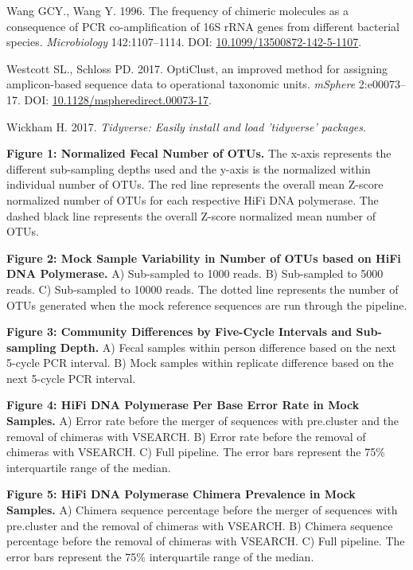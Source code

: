 \documentclass[12pt,]{article}
\begin{document}
\hypertarget{ref-Wang1996}{}
Wang GCY., Wang Y. 1996. The frequency of chimeric molecules as a
consequence of PCR co-amplification of 16S rRNA genes from different
bacterial species. \emph{Microbiology} 142:1107--1114. DOI:
\href{https://doi.org/10.1099/13500872-142-5-1107}{10.1099/13500872-142-5-1107}.

\hypertarget{ref-opticlust_Westcott_2017}{}
Westcott SL., Schloss PD. 2017. OptiClust, an improved method for
assigning amplicon-based sequence data to operational taxonomic units.
\emph{mSphere} 2:e00073--17. DOI:
\href{https://doi.org/10.1128/mspheredirect.00073-17}{10.1128/mspheredirect.00073-17}.

\hypertarget{ref-tidyverse_2017}{}
Wickham H. 2017. \emph{Tidyverse: Easily install and load 'tidyverse'
packages}.

\newpage

\textbf{Figure 1: Normalized Fecal Number of OTUs.} The x-axis
represents the different sub-sampling depths used and the y-axis is the
normalized within individual number of OTUs. The red line represents the
overall mean Z-score normalized number of OTUs for each respective HiFi
DNA polymerase. The dashed black line represents the overall Z-score
normalized mean number of OTUs.

\textbf{Figure 2: Mock Sample Variability in Number of OTUs based on
HiFi DNA Polymerase.} A) Sub-sampled to 1000 reads. B) Sub-sampled to
5000 reads. C) Sub-sampled to 10000 reads. The dotted line represents
the number of OTUs generated when the mock reference sequences are run
through the pipeline.

\textbf{Figure 3: Community Differences by Five-Cycle Intervals and
Sub-sampling Depth.} A) Fecal samples within person difference based on
the next 5-cycle PCR interval. B) Mock samples within replicate
difference based on the next 5-cycle PCR interval.

\textbf{Figure 4: HiFi DNA Polymerase Per Base Error Rate in Mock
Samples.} A) Error rate before the merger of sequences with pre.cluster
and the removal of chimeras with VSEARCH. B) Error rate before the
removal of chimeras with VSEARCH. C) Full pipeline. The error bars
represent the 75\% interquartile range of the median.

\textbf{Figure 5: HiFi DNA Polymerase Chimera Prevalence in Mock
Samples.} A) Chimera sequence percentage before the merger of sequences
with pre.cluster and the removal of chimeras with VSEARCH. B) Chimera
sequence percentage before the removal of chimeras with VSEARCH. C) Full
pipeline. The error bars represent the 75\% interquartile range of the
median.
\end{document}
